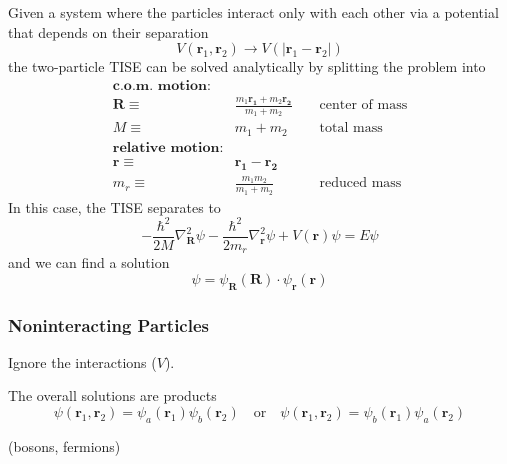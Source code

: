 Given a system where the particles interact only with each other via a potential that depends on their separation
\begin{equation*}
    V(\mathbf{r}_1,\mathbf{r}_2)\to V(|\mathbf{r}_1-\mathbf{r}_2|)
\end{equation*}
the two-particle TISE can be solved analytically by splitting the problem into
\noindent\begin{align*}
    \textbf{c.o.m. motion:}   &                                                                              \\
    \mathbf{R}\equiv\         & \frac{m_1\mathbf{r_1}+m_2\mathbf{r_2}}{m_1+m_2} &   & \text{ center of mass} \\
    M\equiv\                  & m_1 + m_2                                       &   & \text{ total mass}     \\
    \textbf{relative motion:} &                                                                              \\
    \mathbf{r}\equiv\         & \mathbf{r_1}-\mathbf{r_2}                       &                            \\
    m_r\equiv\                & \frac{m_1 m_2}{m_1+m_2}                         &   & \text{ reduced mass}
\end{align*}
In this case, the TISE separates to
\begin{equation*}
    -\frac{\hbar^{2}}{2M}\nabla_{\mathbf{R}}^{2}\psi-\frac{\hbar^{2}}{2m_r}\nabla_{\mathbf{r}}^{2}\psi+V(\mathbf{r})\psi=E\psi
\end{equation*}
and we can find a solution
\begin{equation*}
    \psi = \psi_\mathbf{R}(\mathbf{R})\cdot\psi_\mathbf{r}(\mathbf{r})
\end{equation*}

\subsubsection{Noninteracting Particles}
Ignore the interactions ($V$).
\newpar{}

The overall solutions are products
\begin{equation*}
    \psi(\mathbf{r}_{1},\mathbf{r}_{2} )=\psi_{a}(\mathbf{r}_{1})\psi_{b}(\mathbf{r}_{2}) \quad\text{or}\quad
    \psi(\mathbf{r}_{1},\mathbf{r}_{2}) =\psi_{b}(\mathbf{r}_{1})\psi_{a}(\mathbf{r}_{2})
\end{equation*}

\newpar{}
 (bosons, fermions)

